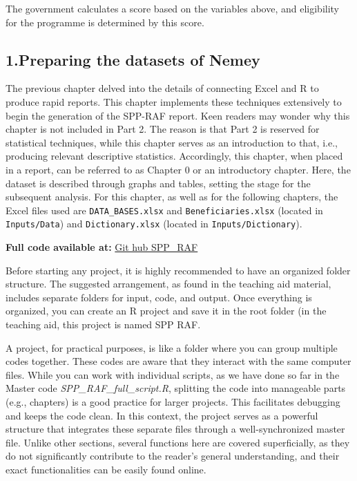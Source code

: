 \documentclass[
]{article}
\begin{document}
The government calculates a score based on the variables above, and
eligibility for the programme is determined by this score.

\subsection{\texorpdfstring{\textbf{1.Preparing the datasets of
Nemey}}{1.Preparing the datasets of Nemey}}\label{preparing-the-datasets-of-nemey}

The previous chapter delved into the details of connecting Excel and R
to produce rapid reports. This chapter implements these techniques
extensively to begin the generation of the SPP-RAF report. Keen readers
may wonder why this chapter is not included in Part 2. The reason is
that Part 2 is reserved for statistical techniques, while this chapter
serves as an introduction to that, i.e., producing relevant descriptive
statistics. Accordingly, this chapter, when placed in a report, can be
referred to as Chapter 0 or an introductory chapter. Here, the dataset
is described through graphs and tables, setting the stage for the
subsequent analysis. For this chapter, as well as for the following
chapters, the Excel files used are \texttt{DATA\_BASES.xlsx} and
\texttt{Beneficiaries.xlsx} (located in \texttt{Inputs/Data}) and
\texttt{Dictionary.xlsx} (located in \texttt{Inputs/Dictionary}).

\textbf{Full code available at:}
\href{https://github.com/ESCWASP/SPP_RAF}{Git hub SPP\_RAF}

Before starting any project, it is highly recommended to have an
organized folder structure. The suggested arrangement, as found in the
teaching aid material, includes separate folders for input, code, and
output. Once everything is organized, you can create an R project and
save it in the root folder (in the teaching aid, this project is named
SPP RAF.

A project, for practical purposes, is like a folder where you can group
multiple codes together. These codes are aware that they interact with
the same computer files. While you can work with individual scripts, as
we have done so far in the Master code \emph{SPP\_RAF\_full\_script.R},
splitting the code into manageable parts (e.g., chapters) is a good
practice for larger projects. This facilitates debugging and keeps the
code clean. In this context, the project serves as a powerful structure
that integrates these separate files through a well-synchronized master
file. Unlike other sections, several functions here are covered
superficially, as they do not significantly contribute to the reader's
general understanding, and their exact functionalities can be easily
found online.
\end{document}
